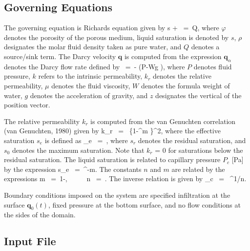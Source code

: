 \documentclass[12pt]{article}
\def\EQ#1\EN{\begin{equation}#1\end{equation}}
\newcommand{\eq}{\ =\ }
\newcommand{\p}{{\partial}}
\renewcommand{\a}{{\alpha}}
\newcommand{\bnabla}{\boldsymbol{\nabla}}
\newcommand{\bq}{\boldsymbol{q}}
\newcommand{\bz}{\boldsymbol{z}}
\begin{document}
\subsection{Governing Equations}

The governing equation is Richards equation given by
\EQ
\frac{\p}{\p t} \varphi s \rho + \bnabla\cdot\bq\rho \eq Q,
\EN
where $\varphi$ denotes the porosity of the porous medium, liquid saturation is denoted by $s$, $\rho$ designates the molar fluid density taken as pure water, and $Q$ denotes a source/sink term. The Darcy velocity $\bq$ is computed from the expression
$\bq_\a$ denotes the Darcy flow rate defined by
\EQ
\bq \eq - \bnabla \big(P-W\rho g \bz\big),
\EN
where $P$ denotes fluid pressure, $k$ refers to the intrinsic permeability, $k_r$ denotes the relative permeability, $\mu$ denotes the fluid viscosity, $W$ denotes the formula weight of water, $g$ denotes the acceleration of gravity, and $z$ designates the vertical of the position vector. 

The relative permeability $k_r$ is computed from the van Genuchten correlation (van Genuchten, 1980) given by
\EQ\label{krl} 
k_{r} \eq {} \left\{1-\left[1-s_e^{1/m} \right]^m \right\}^2, 
\EN 
where the effective saturation $s_e$ is defined as
\EQ 
s_e \eq {}, 
\EN 
where $s_r$ denotes the residual saturation, and $s_0$ denotes the maximum saturation. Note that $k_{r}$ = 0 for saturations below the residual saturation. 
The liquid saturation is related to capillary pressure $P_c$ [Pa] by the expression
\EQ\label{seff}
s_e \eq {}^{-m}. 
\EN 
The constants $n$ and $m$ are related by the expressions 
\EQ\label{lambda} 
m \eq 1-, \ \ \ \ \ n \eq {}. 
\EN 
The inverse relation is given by
\EQ
P_c \eq {} ^{1/n}.
\EN

Boundary conditions imposed on the system are specified infiltration at the surface $\bq_0(t)$, fixed pressure at the bottom surface, and no flow conditions at the sides of the domain.

\subsection{Input File}
\end{document}

